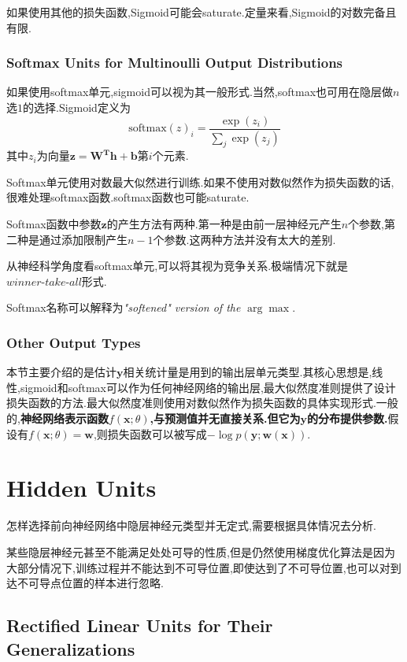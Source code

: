 如果使用其他的损失函数,Sigmoid可能会saturate.定量来看,Sigmoid的对数完备且有限.

\subsubsection{Softmax Units for Multinoulli Output Distributions}

如果使用softmax单元,sigmoid可以视为其一般形式.当然,softmax也可用在隐层做$n$选$1$的选择.Sigmoid定义为
\begin{equation}
\text{softmax}(z)_i=\frac{\exp(z_i)}{\sum_j\exp(z_j)}
\end{equation}
其中$z_i$为向量$\mathbf{z=W^Th+b}$第$i$个元素.

Softmax单元使用对数最大似然进行训练.如果不使用对数似然作为损失函数的话,很难处理softmax函数.softmax函数也可能saturate.

Softmax函数中参数$\mathbf z$的产生方法有两种.第一种是由前一层神经元产生$n$个参数,第二种是通过添加限制产生$n-1$个参数.这两种方法并没有太大的差别.

从神经科学角度看softmax单元,可以将其视为竞争关系.极端情况下就是$\textit{winner-take-all}$形式.

Softmax名称可以解释为\textit{"softened" version of the} $\arg \max$.

\subsubsection{Other Output Types}

本节主要介绍的是估计$\mathbf y$相关统计量是用到的输出层单元类型.其核心思想是,线性,sigmoid和softmax可以作为任何神经网络的输出层,最大似然度准则提供了设计损失函数的方法.最大似然度准则使用对数似然作为损失函数的具体实现形式.一般的,\textbf{神经网络表示函数$f(\mathbf x;\theta)$,与预测值并无直接关系.但它为$\mathbf y$的分布提供参数.}假设有$f(\mathbf x;\theta)=\mathbf w$,则损失函数可以被写成$-\log p(\mathbf y;\mathbf{w(x)})$.

\section{Hidden Units}

怎样选择前向神经网络中隐层神经元类型并无定式,需要根据具体情况去分析.

某些隐层神经元甚至不能满足处处可导的性质,但是仍然使用梯度优化算法是因为大部分情况下,训练过程并不能达到不可导位置,即使达到了不可导位置,也可以对到达不可导点位置的样本进行忽略.

\subsection{Rectified Linear Units for Their Generalizations}

